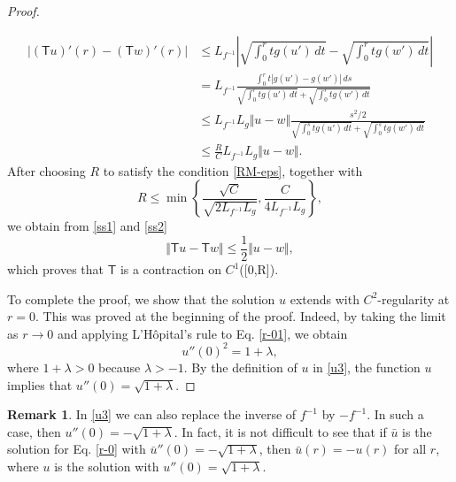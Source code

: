 \documentclass[12pt]{amsart}
\def\t{\mathsf T}
\theoremstyle{definition}
\newtheorem{remark}[theorem]{Remark}
\begin{document}
\begin{proof}
\begin{enumerate}
\begin{equation}
\begin{split}
|(\t u)' (r)- (\t w)'(r)| &\leq L_{f^{-1}}  \left|\sqrt{ \int_0^r  t  g(u') \, dt}- \sqrt{ \int_0^r  t  g(w') \, dt}\right|    \\
&= L_{f^{-1}}  \frac{\int_0^rt|g(u')-g(w')|\, ds}{\sqrt{ \int_0^r  t  g(u') \, dt}+ \sqrt{ \int_0^r  t  g(w') \, dt}}    \\
&\leq L_{f^{-1}} L_g \Vert u-w  \Vert    \frac{s^2/2}{\sqrt{ \int_0^s  t  g(u') \, dt}+ \sqrt{ \int_0^s  t  g(w') \, dt}}\\
&\leq\frac{R}{C}L_{f^{-1}} L_g \Vert u-w  \Vert.
\end{split}
\end{equation}
After choosing $R$ to satisfy the condition \eqref{RM-eps}, together with
$$
R\leq \min \left \{ \frac{\sqrt{C}}{\sqrt{2L_{f^{-1}} L_g}} , \frac{C}{4 L_{f^{-1}} L_g}  \right \},
$$
we obtain from \eqref{ss1} and \eqref{ss2}
$$
\Vert \t u - \t w \Vert \leq \frac12 \Vert  u - w \Vert ,
$$
which proves that $\t$ is a contraction on $C^1$([0,R]).
\end{enumerate}
To complete the proof, we show that the solution $u$ extends with $C^2$-regularity at $r=0$. This was proved at the beginning of the proof. Indeed, by taking the limit as $r\to 0$ and applying L'Hôpital's rule to Eq. \eqref{r-01}, we obtain
$$
u''(0)^2=1+\lambda,
$$
where $1+\lambda >0$ because $\lambda>-1$.  By the definition of $u$ in \eqref{u3},  the function $u$ implies that $u''(0)=\sqrt{1+\lambda}$.
\end{proof}

\begin{remark} \label{r1}
In \eqref{u3} we can also replace the inverse of $f^{-1}$ by $-f^{-1}$. In such a case, then  $u''(0)=-\sqrt{1+\lambda}$.  In fact,  it is not difficult to see that if $\bar{u}$ is the solution for Eq. \eqref{r-0} with $\bar{u}''(0)=-\sqrt{1+\lambda}$, then $\bar{u}(r)=-u(r)$ for all $r$, where $u$ is the solution with $u''(0)=\sqrt{1+\lambda}$.
\end{remark}
 
\end{document}
